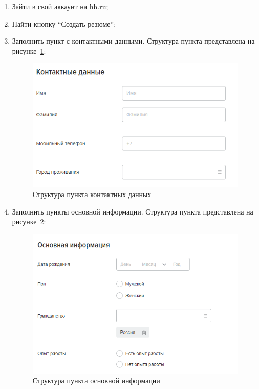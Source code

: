 \documentclass[master, och, pract]{SCWorks}
\begin{document}
\begin{enumerate}
    \item Зайти в свой аккаунт на hh.ru;
    \item Найти кнопку “Создать резюме”;
    \item Заполнить пункт с контактными данными. Структура пункта представлена 
    на рисунке~\ref{fig:1}:
        \begin{figure}[!ht]
            \centering
            \includegraphics[width=12cm]{images/image14.png}
            \caption{\label{fig:1}%
                Структура пункта контактных данных}
        \end{figure}

    \item Заполнить пункты основной информации. Структура пункта представлена 
    на рисунке~\ref{fig:2}:
        \begin{figure}[!ht]
            \centering
            \includegraphics[width=12cm]{images/image12.png}
            \caption{\label{fig:2}%
                Структура пункта основной информации}
        \end{figure}


\end{enumerate}
\end{document}
